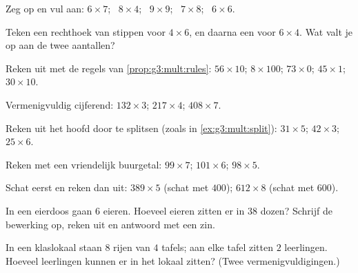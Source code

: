 \begin{exercise}[$\star$]\label{exo:g3:mult:2}
Zeg op en vul aan: $6 \times 7$; \ $8 \times 4$; \ $9 \times 9$;
\ $7 \times 8$; \ $6 \times 6$.
\end{exercise}

\begin{exercise}[$\star$]\label{exo:g3:mult:3}
Teken een rechthoek van stippen voor $4 \times 6$, en daarna een voor
$6 \times 4$. Wat valt je op aan de twee aantallen?
\end{exercise}

\begin{exercise}[$\star$]\label{exo:g3:mult:4}
Reken uit met de regels van \cref{prop:g3:mult:rules}:
$56 \times 10$; \quad $8 \times 100$; \quad $73 \times 0$; \quad
$45 \times 1$; \quad $30 \times 10$.
\end{exercise}

\begin{exercise}[$\star$]\label{exo:g3:mult:5}
Vermenigvuldig cijferend: $132 \times 3$; \quad $217 \times 4$; \quad
$408 \times 7$.
\end{exercise}

\begin{exercise}[$\star$]\label{exo:g3:mult:6}
Reken uit het hoofd door te splitsen (zoals in \cref{ex:g3:mult:split}):
$31 \times 5$; \quad $42 \times 3$; \quad $25 \times 6$.
\end{exercise}

\begin{exercise}[$\star$]\label{exo:g3:mult:7}
Reken met een vriendelijk buurgetal: $99 \times 7$; \quad
$101 \times 6$; \quad $98 \times 5$.
\end{exercise}

\begin{exercise}[$\star$]\label{exo:g3:mult:8}
Schat eerst en reken dan uit: $389 \times 5$ (schat met $400$);
$612 \times 8$ (schat met $600$).
\end{exercise}

\begin{exercise}[$\star$]\label{exo:g3:mult:9}
In een eierdoos gaan $6$ eieren. Hoeveel eieren zitten er in $38$
dozen? Schrijf de bewerking op, reken uit en antwoord met een zin.
\end{exercise}

\begin{exercise}[$\star\star$]\label{exo:g3:mult:10}
In een klaslokaal staan $8$ rijen van $4$ tafels; aan elke tafel zitten
$2$ leerlingen. Hoeveel leerlingen kunnen er in het lokaal zitten?
(Twee vermenigvuldigingen.)
\end{exercise}

